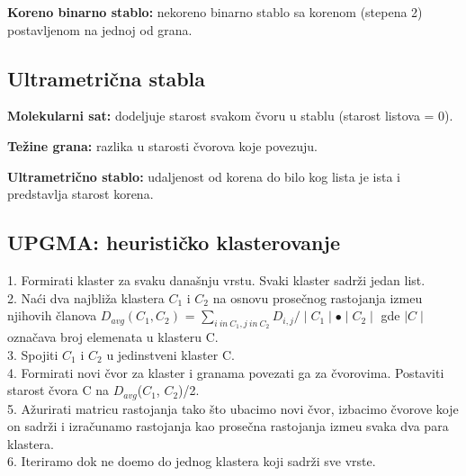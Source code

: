 \begin{definicija}
\textbf{Koreno binarno stablo:} nekoreno binarno stablo sa korenom (stepena 2) postavljenom na jednoj od grana.
\end{definicija}

\subsection{Ultrametri\v{c}na stabla}
\label{subsec:us}

\begin{definicija}
\textbf{Molekularni sat:} dodeljuje starost svakom \v{c}voru u stablu (starost listova = 0).
\end{definicija}

\begin{definicija}
\textbf{Te\v{z}ine grana:} razlika u starosti \v{c}vorova koje povezuju.
\end{definicija}

\begin{definicija}
\textbf{Ultrametri\v{c}no stablo:} udaljenost od korena do bilo kog lista je ista i predstavlja starost korena.
\end{definicija}

\subsection{UPGMA: heuristi\v{c}ko klasterovanje}
\label{subsec:upgma}

\begin{tcolorbox}
1. Formirati klaster za svaku dana\v{s}nju vrstu. Svaki klaster sadr\v{z}i jedan list.\\
2. Na\'ci dva najbli\v{z}a klastera $C_1$ i $C_2$ na osnovu prose\v{c}nog rastojanja izme\dj u njihovih \v{c}lanova $D_{avg}(C_1, C_2)$ = $\sum_{i\ in\ C_1, j\ in\ C_2} D_{i, j} / \mid C_1 \mid \bullet \mid C_2 \mid $ gde $\mid C \mid$ ozna\v{c}ava broj elemenata u klasteru C.\\
3. Spojiti $C_1$ i $C_2$ u jedinstveni klaster C.\\
4. Formirati novi \v{c}vor za klaster i granama povezati ga za \v{c}vorovima. Postaviti starost \v{c}vora C na $D_{avg}$($C_1$, $C_2$)/2.\\
5. A\v{z}urirati matricu rastojanja tako \v{s}to ubacimo novi \v{c}vor, izbacimo \v{c}vorove koje on sadr\v{z}i i izra\v{c}unamo rastojanja kao prose\v{c}na rastojanja izme\dj u svaka dva para klastera.\\
6. Iteriramo dok ne do\dj emo do jednog klastera koji sadr\v{z}i sve vrste.
\end{tcolorbox}

